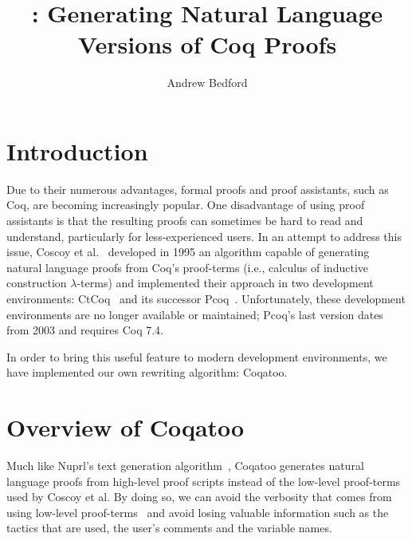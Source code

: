 \documentclass[sigplan,screen,9pt]{acmart}
\begin{document}
\title[Coqatoo]{\coqatoo: Generating Natural Language Versions of Coq Proofs}


\author{Andrew Bedford}



\maketitle

\section{Introduction}
Due to their numerous advantages, formal proofs and proof assistants, such as Coq, are becoming increasingly popular. One disadvantage of using proof assistants is that the resulting proofs can sometimes be hard to read and understand, particularly for less-experienced users. In an attempt to address this issue, Coscoy et al.~\cite{DBLP:conf/tlca/CoscoyKT95} developed in 1995 an algorithm capable of generating natural language proofs from Coq's proof-terms (i.e., calculus of inductive construction $\lambda$-terms) and implemented their approach in two development environments: CtCoq~\cite{CtCoq,bertot1999ctcoq} and its successor Pcoq~\cite{Pcoq,amerkad2001mathematics}. Unfortunately, these development environments are no longer available or maintained; Pcoq's last version dates from 2003 and requires Coq 7.4.

In order to bring this useful feature to modern development environments, we have implemented our own rewriting algorithm: Coqatoo.


\section{Overview of Coqatoo}
Much like Nuprl's text generation algorithm~\cite{DBLP:conf/aaai/Holland-MinkleyBC99}, Coqatoo generates natural language proofs from high-level proof scripts instead of the low-level proof-terms used by Coscoy et al. By doing so, we can avoid the verbosity that comes from using low-level proof-terms~\cite{DBLP:conf/lacl/Coscoy96} and avoid losing valuable information such as the tactics that are used, the user's comments and the variable names. 
\end{document}

